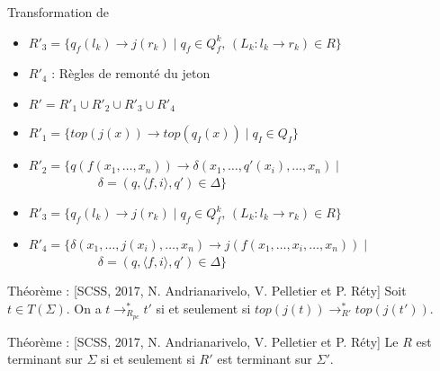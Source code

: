 \begin{frame}{Transformation de \pctrs}
\begin{overprint}
\begin{itemize}
    \item $R'_3 = \{q_f(l_k) \rightarrow j(r_k) \mid q_f \in Q_f^k,\, (L_k : l_k \rightarrow r_k) \in R\}$
    \item $R'_4$ : Règles de remonté du jeton
    \end{itemize}
    \begin{itemize}
    \item $R' = R'_1 \cup R'_2 \cup R'_3 \cup R'_4$
    \item $R'_1 = \{top(j(x)) \rightarrow top(q_I(x)) \mid q_I \in Q_I\}$
    \item $R'_2 = \{q(f(x_1,\ldots,x_n))\rightarrow \delta(x_1,\ldots,q'(x_i),\ldots,x_n) \mid$\\
      ~~~~~~~~~~~$\delta=(q, \langle f,i \rangle, q') \in \Delta\}$
    \item $R'_3 = \{q_f(l_k) \rightarrow j(r_k) \mid q_f \in Q_f^k,\, (L_k : l_k \rightarrow r_k) \in R\}$
    \item $R'_4 = \{\delta(x_1,\ldots,j(x_i),\ldots,x_n)\rightarrow j(f(x_1,\ldots,x_i,\ldots,x_n)) \mid$\\
      ~~~~~~~~~~~$\delta=(q, \langle f,i \rangle, q') \in \Delta\}$
    \end{itemize}
  \end{overprint}
  \begin{alertblock}{Théorème : {\small[SCSS, 2017, N. Andrianarivelo, V. Pelletier et P. Réty]}}
    Soit $t \in T(\Sigma)$. On a $t \rightarrow^*_{R_{pc}} t'$ si et seulement si $top(j(t)) \rightarrow^*_{R'} top(j(t'))$.
  \end{alertblock}
  \begin{alertblock}{Théorème : {\small[SCSS, 2017, N. Andrianarivelo, V. Pelletier et P. Réty]}}
    Le \pctrs $R$ est terminant sur $\Sigma$ si et seulement si $R'$ est terminant sur $\Sigma'$.
  \end{alertblock}
\end{frame}

